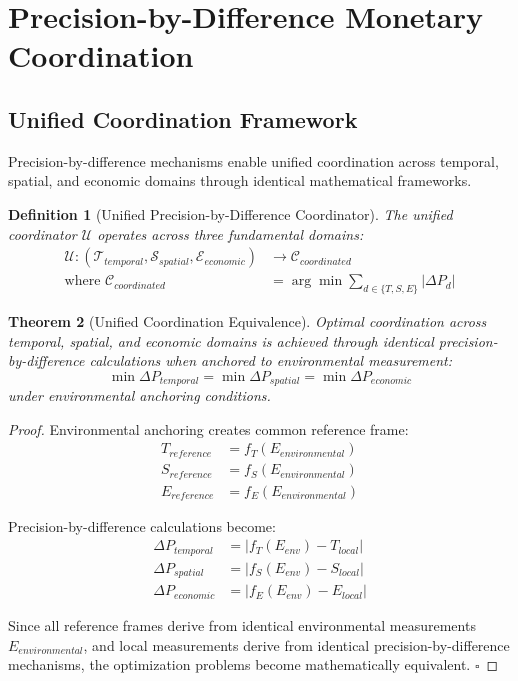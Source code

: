 \documentclass[12pt,a4paper]{article}
\newtheorem{theorem}{Theorem}
\newtheorem{definition}[theorem]{Definition}
\begin{document}
\section{Precision-by-Difference Monetary Coordination}

\subsection{Unified Coordination Framework}

Precision-by-difference mechanisms enable unified coordination across temporal, spatial, and economic domains through identical mathematical frameworks.

\begin{definition}[Unified Precision-by-Difference Coordinator]
The unified coordinator $\mathcal{U}$ operates across three fundamental domains:
\begin{align}
\mathcal{U}: (\mathcal{T}_{temporal}, \mathcal{S}_{spatial}, \mathcal{E}_{economic}) &\to \mathcal{C}_{coordinated} \\
\text{where } \mathcal{C}_{coordinated} &= \arg\min \sum_{d \in \{T,S,E\}} |\Delta P_d|
\end{align}
\end{definition}

\begin{theorem}[Unified Coordination Equivalence]
Optimal coordination across temporal, spatial, and economic domains is achieved through identical precision-by-difference calculations when anchored to environmental measurement:
\begin{equation}
\min \Delta P_{temporal} = \min \Delta P_{spatial} = \min \Delta P_{economic}
\end{equation}
under environmental anchoring conditions.
\end{theorem}

\begin{proof}
Environmental anchoring creates common reference frame:
\begin{align}
T_{reference} &= f_T(E_{environmental}) \\
S_{reference} &= f_S(E_{environmental}) \\
E_{reference} &= f_E(E_{environmental})
\end{align}

Precision-by-difference calculations become:
\begin{align}
\Delta P_{temporal} &= |f_T(E_{env}) - T_{local}| \\
\Delta P_{spatial} &= |f_S(E_{env}) - S_{local}| \\
\Delta P_{economic} &= |f_E(E_{env}) - E_{local}|
\end{align}

Since all reference frames derive from identical environmental measurements $E_{environmental}$, and local measurements derive from identical precision-by-difference mechanisms, the optimization problems become mathematically equivalent. $\square$
\end{proof}
\end{document}
